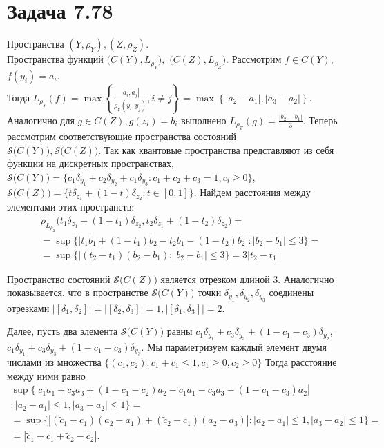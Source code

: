 \documentclass[a4paper,12pt]{article}
\date{\today}
\begin{document}
\section{Задача 7.78}
Пространства $ (Y,\rho_Y),(Z,\rho_Z) $. \\Пространства функций 
$ \big(C(Y),L_{\rho_Y}\big), $  $\big(C(Z),L_{\rho_Z}\big) $. Рассмотрим $ f\in C(Y) $, $ f(y_i)=a_i $.\\
Тогда $ L_{\rho_Y}(f) = \max\left\{\frac{|a_i,a_j|}{\rho_Y(y_i,y_j)},i\neq j\right\} = \max\left\{|a_2-a_1|,|a_3-a_2|\right\}$.\\
Аналогично для $ g\in C(Z), g(z_i) = b_i $ выполнено $ L_{\rho_Z}(g) = \frac{|b_2-b_1|}{3} .$
Теперь рассмотрим соответствующие пространства состояний\\ $ \mathcal{S}\big(C(Y)\big) ,\mathcal{S}\big(C(Z)\big)$. Так как квантовые пространства представляют из себя функции на дискретных пространствах, $ \mathcal{S}\big(C(Y)\big) = \{c_1 \delta_{y_1} + c_2 \delta_{y_2} + c_1 \delta_{y_3} \colon c_1+c_2+c_3=1, c_i\ge 0\}$,
$ \mathcal{S}\big(C(Z)\big) = \{t \delta_{z_1} + (1-t) \delta_{z_2}\colon t \in [0,1]\}$. Найдем расстояния между элементами этих пространств:
\begin{multline*}
  \rho_{L_{\rho_Z}}\big(t_1\delta_{z_1} + (1-t_1)\delta_{z_2},t_2\delta_{z_1} + (1-t_2)\delta_{z_2}\big) =\\
  = \sup\big\{|t_1b_1 + (1-t_1)b_2 - t_2b_1 - (1-t_2)b_2| \colon |b_2-b_1|\le 3\big\}=\\
  = \sup\big\{|(t_2-t_1)(b_2-b_1)\colon |b_2-b_1|\le 3\big\}=3|t_2-t_1|
\end{multline*}

Пространство состояний $ \mathcal{S}\big(C(Z)\big) $ является отрезком длиной $ 3 $. Аналогично показывается, что в пространстве $ \mathcal{S}\big(C(Y)\big) $ точки $ \delta_{y_1},\delta_{y_2},\delta_{y_3} $ соединены отрезками $ \big|\left[\delta_1,\delta_2\right]\big|=\big|\left[\delta_2,\delta_3\right]\big|=1,\big|\left[\delta_1,\delta_3\right]\big|=2 .$

Далее, пусть два элемента $ \mathcal{S}\big(C(Y)\big)$ равны $ c_1 \delta_{y_1} + c_3 \delta_{y_3}  + (1-c_1 - c_3)\delta_{y_2} $, $ \widetilde{c}_1 \delta_{y_1} + \widetilde{c}_3 \delta_{y_3}  + (1-\widetilde{c}_1 - \widetilde{c}_3)\delta_{y_3} $. Мы параметризуем каждый элемент двумя числами из множества $\{(c_1,c_2) \colon c_1 + c_1 \le 1, c_1\ge 0, c_2 \ge 0\}$ Тогда расстояние между ними равно 
\begin{multline*}
  \sup\big\{|c_1 a_1 + c_3a_3+(1-c_1-c_2)a_2 - \widetilde{c}_1a_1-\widetilde{c}_3a_3 - (1-\widetilde{c}_1-\widetilde{c}_3)a_2|\\ \colon |a_2-a_1|\le1, |a_3-a_2|\le 1\big\} = \\
 = \sup\big\{|(\widetilde{c}_1 - c_1)(a_2-a_1) + (\widetilde{c}_2-c_1)(a_2-a_3)| \colon|a_2-a_1|\le1, |a_3-a_2|\le 1 \big\} =\\
  = |\widetilde{c}_1-c_1 + \widetilde{c}_2 - c_2|.
\end{multline*}  
\end{document}
